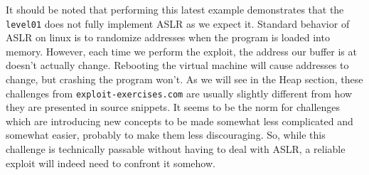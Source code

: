 It should be noted that performing this latest example demonstrates that
the \texttt{level01} does not fully implement ASLR as we expect it. Standard
behavior of ASLR on linux is to randomize addresses when the program is
loaded into memory. However, each time we perform the exploit, the address our
buffer is at doesn't actually change. Rebooting the virtual machine will
cause addresses to change, but crashing the program won't. As we will
see in the Heap section, these challenges from \texttt{exploit-exercises.com}
are usually slightly different from how they are presented in source
snippets. It seems to be the norm for challenges which are introducing new
concepts to be made somewhat less complicated and somewhat easier, probably
to make them less discouraging. So, while this challenge is technically
passable without having to deal with ASLR, a reliable exploit will indeed
need to confront it somehow.
